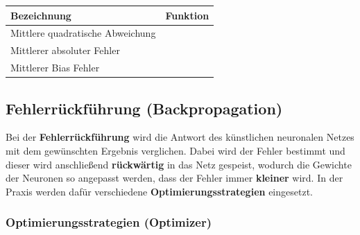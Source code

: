 	\begin{center}
	\begin{tabular}[t]{|l|l|}
		\hline
		\textbf{Bezeichnung} & \textbf{Funktion} \\
		\hline
		Mittlere quadratische Abweichung  &  
		\addvbuffer[0.05cm]{
			$ \textrm{MSE} = \frac{\sum_{i=1}^{n} (y_i - \hat{y_i})^2}{n} $
		} \\
		\hline
		Mittlerer absoluter Fehler  &  
		\addvbuffer[0.05cm]{
			$ \textrm{MAE} = \frac{\sum_{i=1}^{n} |y_i - \hat{y_i}|}{n} $
		} \\
		\hline
		Mittlerer Bias Fehler  &  
		\addvbuffer[0.05cm]{
			$ \textrm{MBE} = \frac{\sum_{i=1}^{n} (y_i - \hat{y_i})}{n} $
		} \\
		\hline
		
	\end{tabular}
	\end{center}

\subsection{Fehlerrückführung (Backpropagation)}

	Bei der \textbf{Fehlerrückführung} wird die Antwort des künstlichen neuronalen Netzes mit dem gewünschten Ergebnis verglichen. Dabei wird der Fehler bestimmt und dieser wird anschließend \textbf{rückwärtig} in das Netz gespeist, wodurch die Gewichte der Neuronen so angepasst werden, dass der Fehler immer \textbf{kleiner} wird. In der Praxis werden dafür verschiedene \textbf{Optimierungsstrategien} eingesetzt. \cite{rocketloop}
	
\subsubsection{Optimierungsstrategien (Optimizer)}


